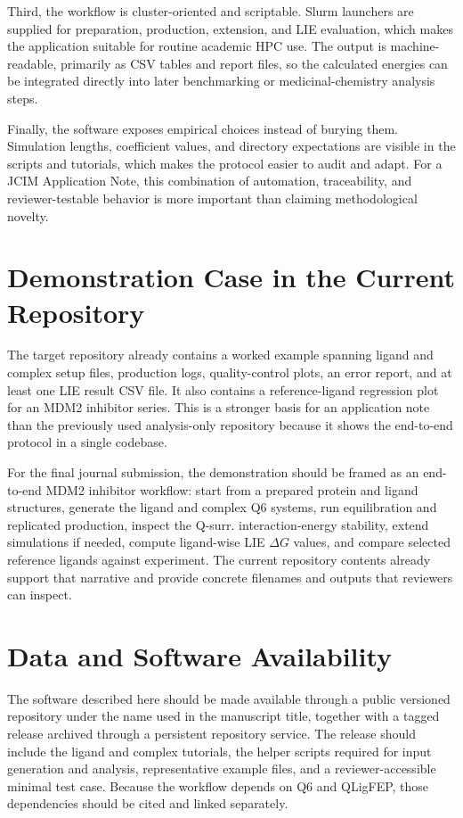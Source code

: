\documentclass[journal=jcisd8,manuscript=article]{achemso}
\begin{document}
Third, the workflow is cluster-oriented and scriptable. Slurm launchers are supplied for preparation, production, extension, and LIE evaluation, which makes the application suitable for routine academic HPC use. The output is machine-readable, primarily as CSV tables and report files, so the calculated energies can be integrated directly into later benchmarking or medicinal-chemistry analysis steps.

Finally, the software exposes empirical choices instead of burying them. Simulation lengths, coefficient values, and directory expectations are visible in the scripts and tutorials, which makes the protocol easier to audit and adapt. For a JCIM Application Note, this combination of automation, traceability, and reviewer-testable behavior is more important than claiming methodological novelty.

\section{Demonstration Case in the Current Repository}

The target repository already contains a worked example spanning ligand and complex setup files, production logs, quality-control plots, an error report, and at least one LIE result CSV file. It also contains a reference-ligand regression plot for an MDM2 inhibitor series. This is a stronger basis for an application note than the previously used analysis-only repository because it shows the end-to-end protocol in a single codebase.

For the final journal submission, the demonstration should be framed as an end-to-end MDM2 inhibitor workflow: start from a prepared protein and ligand structures, generate the ligand and complex Q6 systems, run equilibration and replicated production, inspect the Q-surr. interaction-energy stability, extend simulations if needed, compute ligand-wise LIE \(\Delta G\) values, and compare selected reference ligands against experiment. The current repository contents already support that narrative and provide concrete filenames and outputs that reviewers can inspect.

\section{Data and Software Availability}

The software described here should be made available through a public versioned repository under the name used in the manuscript title, together with a tagged release archived through a persistent repository service. The release should include the ligand and complex tutorials, the helper scripts required for input generation and analysis, representative example files, and a reviewer-accessible minimal test case. Because the workflow depends on Q6 and QLigFEP, those dependencies should be cited and linked separately.\cite{bauer2018q6,q6repo,qligfeprepo}
\end{document}
